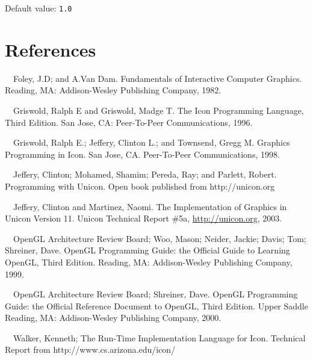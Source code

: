 \documentclass[letterpaper]{article}
\begin{document}
\noindent
Default value: \texttt{1.0}


\section[References]{References}


\noindent
[Foley82]\ \ Foley, J.D; and A.Van Dam.
Fundamentals of Interactive Computer Graphics. Reading, MA: Addison-Wesley
Publishing Company, 1982.


\bigskip

\noindent
[Griswold96] \ \ Griswold, Ralph E and Griswold, Madge T.
The Icon Programming Language, Third Edition. San Jose, CA:
Peer-To-Peer Communications, 1996.

\bigskip

\noindent
[Griswold98]\ \ Griswold, Ralph E.; Jeffery, Clinton L.; and Townsend, Gregg M.
Graphics Programming in Icon. San Jose, CA.
Peer-To-Peer Communications, 1998.

\bigskip

\noindent
[Jeffery03]\ \ Jeffery, Clinton; Mohamed, Shamim; Pereda, Ray; and
Parlett, Robert. Programming with Unicon. Open book published from
http://unicon.org


\bigskip

\noindent
[JeffMart03]\ \ Jeffery, Clinton and Martinez, Naomi. The Implementation of Graphics in Unicon Version 11. Unicon
Technical Report \#5a, \href{http://unicon.org/}{http://unicon.org}, 2003.

\bigskip

\noindent
[OpenGL99] \ \ OpenGL Architecture Review Board; Woo, Mason; Neider, Jackie; Davis;
Tom; Shreiner, Dave. OpenGL Programming Guide: the Official Guide to
Learning OpenGL, Third Edition. Reading, MA: Addison-Wesley
Publishing Company, 1999.


\bigskip

\noindent
[OpenGL00] \ \ OpenGL Architecture Review Board; Shreiner, Dave.
OpenGL Programming Guide: the Official Reference Document to
OpenGL, Third Edition. Upper Saddle Reading, MA: Addison-Wesley
Publishing Company, 2000.


\bigskip

\noindent
[Walker94]\ \ Walker, Kenneth; The Run-Time Implementation Language
for Icon. Technical Report from http://www.cs.arizona.edu/icon/
\end{document}
